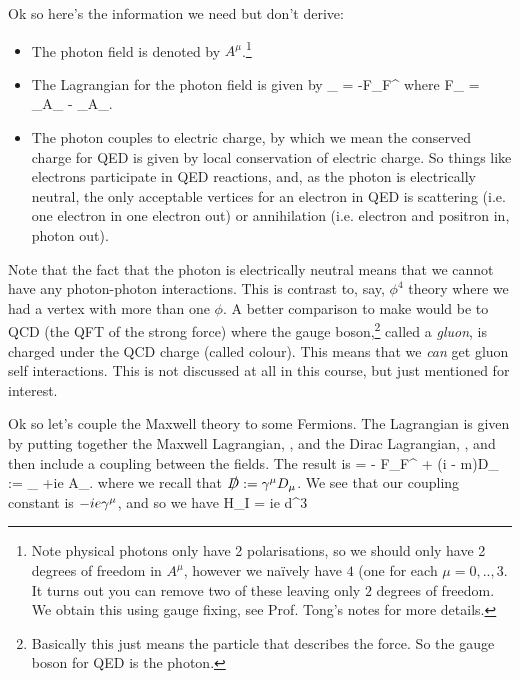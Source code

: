 Ok so here's the information we need but don't derive: 
\begin{itemize}
    \item The photon field is denoted by $A^{\mu}$.\footnote{Note physical photons only have 2 polarisations, so we should only have 2 degrees of freedom in $A^{\mu}$, however we na\"{i}vely have $4$ (one for each $\mu=0,..,3$. It turns out you can remove two of these leaving only $2$ degrees of freedom. We obtain this using gauge fixing, see Prof. Tong's notes for more details.}
    \item The Lagrangian for the photon field is given by 
    \be 
    \label{eqn:MaxwellLagrangian}
        \cL_{} = -F_{\mu\nu}F^{\mu\nu} 
    \ee 
    where 
    \bse 
        F_{\mu\nu} = \p_{\mu}A_{\nu} - \p_{\nu}A_{\mu}. 
    \ese 
    \item The photon couples to electric charge, by which we mean the conserved charge for QED is given by local conservation of electric charge. So things like electrons participate in QED reactions, and, as the photon is electrically neutral, the only acceptable vertices for an electron in QED is scattering (i.e. one electron in one electron out) or annihilation (i.e. electron and positron in, photon out). 
\end{itemize}

\br 
    Note that the fact that the photon is electrically neutral means that we cannot have any photon-photon interactions. This is contrast to, say, $\phi^4$ theory where we had a vertex with more than one $\phi$. A better comparison to make would be to QCD (the QFT of the strong force) where the gauge boson,\footnote{Basically this just means the particle that describes the force. So the gauge boson for QED is the photon.} called a \textit{gluon}, is charged under the QCD charge (called colour). This means that we \textit{can} get gluon self interactions. This is not discussed at all in this course, but just mentioned for interest. 
\er 

Ok so let's couple the Maxwell theory to some Fermions. The Lagrangian is given by putting together the Maxwell Lagrangian, , and the Dirac Lagrangian, , and then include a coupling between the fields. The result is 
\be 
\label{eqn:QEDLagrangian}
    \cL = - F_{\mu\nu}F^{\mu\nu} + \overline{\psi}\big(i - m)\psi \qquad D_{\mu} := \p_{\mu} +ie A_{\mu}.
\ee 
where we recall that $\slashed{D} := \gamma^{\mu}D_{\mu}$. We see that our coupling constant is $-ie\gamma^{\mu}$, and so we have 
\be 
\label{eqn:HIQED}
    H_I = ie \int d^3  \, \overline{\psi}\psi
\ee 

